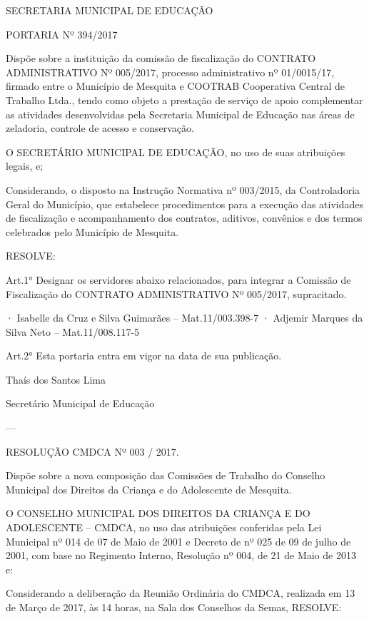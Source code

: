 \documentclass{doliberto}
\begin{document}
SECRETARIA MUNICIPAL DE EDUCAÇÃO 
 
PORTARIA Nº 394/2017 
 
Dispõe  sobre  a  instituição  da  comissão  de  fiscalização  do 
CONTRATO  ADMINISTRATIVO  Nº  005/2017,  processo 
administrativo  nº  01/0015/17, 
firmado  entre  o 
Município de Mesquita e COOTRAB Cooperativa Central 
de  Trabalho  Ltda.,  tendo  como  objeto  a  prestação  de 
serviço de apoio complementar as atividades desenvolvidas 
pela  Secretaria  Municipal  de  Educação  nas  áreas  de 
zeladoria, controle de acesso e conservação. 
 
O  SECRETÁRIO  MUNICIPAL  DE  EDUCAÇÃO,  no  uso  de
suas atribuições legais, e; 
 
Considerando,  o  disposto  na  Instrução  Normativa  nº 
003/2015,  da  Controladoria  Geral  do  Município,  que 
estabelece  procedimentos  para  a  execução  das  atividades 
de  fiscalização  e  acompanhamento  dos  contratos,  aditivos, 
convênios  e  dos  termos  celebrados  pelo  Município  de 
Mesquita. 
 
RESOLVE: 
 
Art.1°  Designar  os  servidores  abaixo  relacionados,  para 
integrar  a  Comissão  de  Fiscalização  do  CONTRATO 
ADMINISTRATIVO Nº 005/2017, supracitado. 
 
· Isabelle da Cruz e Silva Guimarães – Mat.11/003.398-7 
· Adjemir Marques da Silva Neto – Mat.11/008.117-5 
 
Art.2°  Esta  portaria  entra  em  vigor  na  data  de  sua 
publicação. 
 

Thaís dos Santos Lima 

Secretário Municipal de Educação

---

RESOLUÇÃO CMDCA Nº 003 / 2017.  

Dispõe  sobre  a  nova  composição  das  Comissões  de 
Trabalho  do  Conselho  Municipal  dos  Direitos  da 
Criança e do Adolescente de Mesquita.                                        

O  CONSELHO  MUNICIPAL  DOS  DIREITOS  DA  CRIANÇA  E 
DO  ADOLESCENTE  –  CMDCA,  no  uso  das  atribuições 
conferidas pela Lei Municipal nº 014 de 07 de Maio de 2001 
e  Decreto  de  nº  025  de  09  de  julho  de  2001,  com  base  no 
Regimento  Interno,  Resolução  nº  004,  de  21  de  Maio  de 
2013 e:  

Considerando  a  deliberação  da  Reunião  Ordinária  do 
CMDCA, realizada em 13 de Março de 2017, às 14 horas, na 
Sala dos Conselhos da Semas, RESOLVE:   
\end{document}

